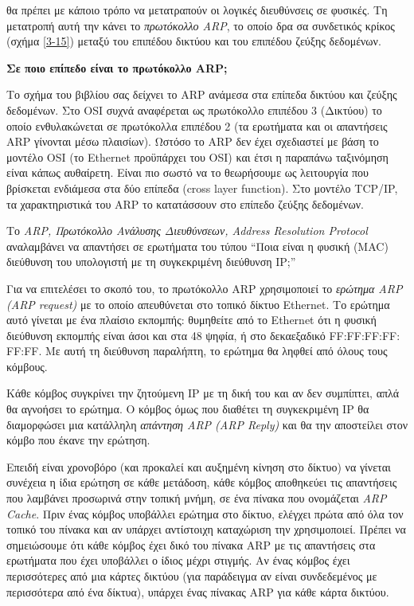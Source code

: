 θα πρέπει με κάποιο τρόπο να μετατραπούν οι λογικές διευθύνσεις σε φυσικές. Τη μετατροπή αυτή την κάνει το \emph{πρωτόκολλο ARP}, το οποίο δρα σα συνδετικός κρίκος (σχήμα \ref{3-15}) μεταξύ του επιπέδου δικτύου και του επιπέδου ζεύξης δεδομένων.

\begin{inthebox}
\textbf{Σε ποιο επίπεδο είναι το πρωτόκολλο ARP;}

Το σχήμα του βιβλίου σας δείχνει το ARP ανάμεσα στα επίπεδα δικτύου και ζεύξης δεδομένων. Στο OSI συχνά αναφέρεται ως πρωτόκολλο επιπέδου 3 (Δικτύου) το οποίο ενθυλακώνεται σε πρωτόκολλα επιπέδου 2 (τα ερωτήματα και οι απαντήσεις ARP γίνονται μέσω πλαισίων). Ωστόσο το ARP δεν έχει σχεδιαστεί με βάση το μοντέλο OSI (το Ethernet προϋπάρχει του OSI) και έτσι η παραπάνω ταξινόμηση είναι κάπως αυθαίρετη. Είναι πιο σωστό να το θεωρήσουμε ως λειτουργία που βρίσκεται ενδιάμεσα στα δύο επίπεδα (cross layer function). Στο μοντέλο TCP/IP, τα χαρακτηριστικά του ARP το κατατάσσουν στο επίπεδο ζεύξης δεδομένων.\\
\end{inthebox}

Το \emph{ARP, Πρωτόκολλο Ανάλυσης Διευθύνσεων, Address Resolution Protocol}  αναλαμβάνει να απαντήσει σε ερωτήματα του τύπου ``Ποια είναι η φυσική (MAC) διεύθυνση του υπολογιστή με τη συγκεκριμένη διεύθυνση IP;'' 

Για να επιτελέσει το σκοπό του, το πρωτόκολλο ARP χρησιμοποιεί το \emph{ερώτημα ARP (ARP request)} με το οποίο απευθύνεται στο τοπικό δίκτυο Ethernet. Το ερώτημα αυτό γίνεται με ένα πλαίσιο εκπομπής: θυμηθείτε από το Ethernet ότι η φυσική διεύθυνση εκπομπής είναι άσοι και στα 48 ψηφία, ή στο δεκαεξαδικό FF:FF:FF:FF: FF:FF. Με αυτή τη διεύθυνση παραλήπτη, το ερώτημα θα ληφθεί από όλους τους κόμβους.

Κάθε κόμβος συγκρίνει την ζητούμενη IP με τη δική του και αν δεν συμπίπτει, απλά θα αγνοήσει το ερώτημα. Ο κόμβος όμως που διαθέτει τη συγκεκριμένη IP θα διαμορφώσει μια κατάλληλη \emph{απάντηση ARP (ARP Reply)} και θα την αποστείλει στον κόμβο που έκανε την ερώτηση.

Επειδή είναι χρονοβόρο (και προκαλεί και αυξημένη κίνηση στο δίκτυο) να γίνεται συνέχεια η ίδια ερώτηση σε κάθε μετάδοση, κάθε κόμβος αποθηκεύει τις απαντήσεις που λαμβάνει προσωρινά στην τοπική μνήμη, σε ένα πίνακα που ονομάζεται \emph{ARP Cache}. Πριν ένας κόμβος υποβάλλει ερώτημα στο δίκτυο, ελέγχει πρώτα από όλα τον τοπικό του πίνακα και αν υπάρχει αντίστοιχη καταχώριση την χρησιμοποιεί. Πρέπει να σημειώσουμε ότι κάθε κόμβος έχει δικό του πίνακα ARP με τις απαντήσεις στα ερωτήματα που έχει υποβάλλει ο ίδιος μέχρι στιγμής. Αν ένας κόμβος έχει περισσότερες από μια κάρτες δικτύου (για παράδειγμα αν είναι συνδεδεμένος με περισσότερα από ένα δίκτυα), υπάρχει ένας πίνακας ARP για κάθε κάρτα δικτύου. 

